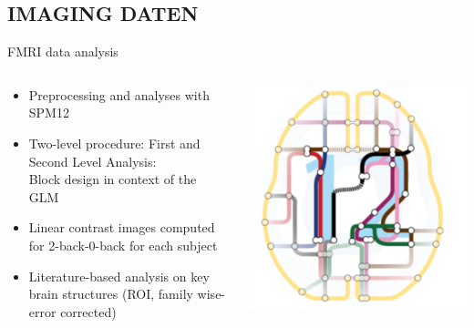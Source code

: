 \documentclass{bredelebeamer}
\begin{document}
\subsection{IMAGING DATEN}
\begin{frame}{FMRI data analysis}
\begin{columns}
\begin{column}{6cm}
\begin{itemize}
\small
    \item Preprocessing and analyses with SPM12
    \item Two-level procedure: First and Second Level Analysis: \\
    Block design in context of the GLM 
    \item Linear contrast images computed for 2-back-0-back for each subject
    \item Literature-based analysis on key brain structures (ROI, family wise-error corrected) 
\end{itemize}
\end{column}
\begin{column}{5cm}
  \includegraphics[scale=0.40]{images/SPM.PNG}
\end{column}
\end{columns}
\end{frame}
\end{document}
